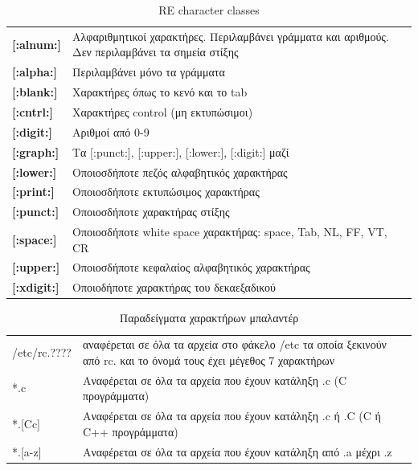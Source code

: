 	

\begin{table}[h]
	\begin{tabularx}{\columnwidth}{l|X}
		\textbf{[:alnum:]} & Αλφαριθμητικοί χαρακτήρες. Περιλαμβάνει γράμματα και αριθμούς. Δεν περιλαμβάνει τα σημεία στίξης \\
		\textbf{[:alpha:]} & Περιλαμβάνει μόνο τα γράμματα\\
		\textbf{[:blank:]} & Χαρακτήρες όπως το κενό και το tab\\
		\textbf{[:cntrl:]} & Χαρακτήρες control (μη εκτυπώσιμοι)\\	
		\textbf{[:digit:]} & Αριθμοί από 0-9\\
		\textbf{[:graph:]} & Τα [:punct:], [:upper:], [:lower:], [:digit:] μαζί \\
		\textbf{[:lower:]} & Οποιοσδήποτε πεζός αλφαβητικός χαρακτήρας \\
		\textbf{[:print:]} & Οποιοσδήποτε εκτυπώσιμος χαρακτήρας\\	
		\textbf{[:punct:]} & Οποιοσδήποτε χαρακτήρας στίξης \\
		\textbf{[:space:]} & Οποιοσδήποτε white space χαρακτήρας: space, Tab, NL, FF, VT, CR \\
		\textbf{[:upper:]} &  Οποιοσδήποτε κεφαλαίος αλφαβητικός χαρακτήρας\\
		\textbf{[:xdigit:]} & Οποιοδήποτε χαρακτήρας του δεκαεξαδικού\\			
	\end{tabularx}  
	\caption{RE character classes}
	\label{tbl:re-classes}
\end{table}



\begin{table}[h]
	\small
	\begin{tabularx}{\columnwidth}{l|X}
		/etc/rc.???? 	& αναφέρεται σε όλα τα αρχεία στο φάκελο /etc τα οποία ξεκινούν από rc.  
		και το όνομά τους έχει μέγεθος 7 χαρακτήρων \\
		*.c  		& Αναφέρεται σε όλα τα αρχεία που έχουν κατάληξη  .c (C προγράμματα)  \\
		*.[Cc] 	& Αναφέρεται σε όλα τα αρχεία που έχουν κατάληξη  .c ή .C  (C ή C++  προγράμματα)  \\
		*.[a-z]  	& Αναφέρεται σε όλα τα αρχεία που έχουν κατάληξη από .a μέχρι .z \\
		
	\end{tabularx}  
	\caption{Παραδείγματα χαρακτήρων μπαλαντέρ}
\end{table}



